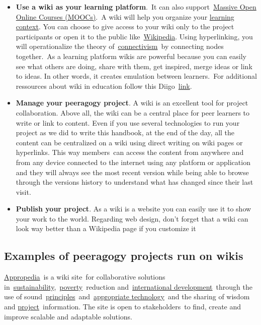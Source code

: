 \begin{itemize}
\itemsep1pt\parskip0pt
\item
  \textbf{Use a wiki as your learning platform}.~It can also
  support~\href{http://socialmediaclassroom.com/host/peeragogy/wiki/connectivism-practice-how-organize-a-mooc}{Massive
  Open Online Courses (MOOCs)}.~A wiki will help you organize your
  \href{http://socialmediaclassroom.com/host/peeragogy/wiki/organizing-a-learning-context}{learning
  context}. You can choose to give access to your wiki only to the
  project participants or open it to the public
  like~\href{http://www.wikipedia.org/}{Wikipedia}. Using hyperlinking,
  you will operationalize the theory
  of~\href{http://en.wikipedia.org/wiki/Connectivism}{connectivism}~by
  connecting nodes together.~As a learning platform wikis are powerful
  because you can easily see what others are doing, share with them, get
  inspired, merge ideas or link to ideas. In other words, it creates
  emulation between learners.~For additional ressources about wiki in
  education follow this
  Diigo~\href{http://www.diigo.com/user/regisb/wiki\%20education}{link}.
\item
  \textbf{Manage your peeragogy project}. A wiki is an excellent tool
  for project collaboration. Above all, the wiki can be a central place
  for peer learners to write or link to content. Even if you use several
  technologies to run your project as we did to write this handbook, at
  the end of the day, all the content can be centralized on a wiki using
  direct writing on wiki pages or hyperlinks. This way members~can
  access the content from anywhere and from any device connected to the
  internet using any platform or application and they will always see
  the most recent version while being able to browse through the
  versions history to understand what has changed since their last
  visit.
\item
  \textbf{Publish your project}. As a wiki is a website you can easily
  use it to show your work to the world. Regarding web design, don't
  forget that a wiki can look way better than a Wikipedia page if you
  customize it
\end{itemize}

\subsection{Examples of peeragogy projects run on
wikis}\label{examples-of-peeragogy-projects-run-on-wikis}

\href{http://www.appropedia.org/Welcome_to_Appropedia}{Appropedia}~is a
wiki site~for collaborative solutions
in~\href{http://www.appropedia.org/Sustainability}{sustainability},~\href{http://www.appropedia.org/Poverty}{poverty}~reduction
and~\href{http://www.appropedia.org/International_development}{international
development}~through the use of
sound~\href{http://www.appropedia.org/Principles}{principles}~and~\href{http://www.appropedia.org/Appropriate_technology}{appropriate
technology}~and the sharing of wisdom and
\href{http://www.appropedia.org/Project}{project}~information. The site
is open to stakeholders~to find, create and improve scalable and
adaptable solutions.

